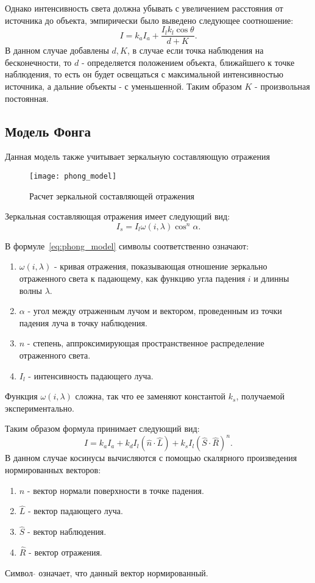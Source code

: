 Однако интенсивность света должна убывать с увеличением расстояния от источника до объекта, эмпирически было выведено следующее соотношение:
\begin{equation} 
	I = k_aI_a + \frac{I_lk_l\cos\theta}{d + K}.
	\label{eq:lambert_model_space}
\end{equation}
В данном случае добавлены $d,K$, в случае если точка наблюдения на бесконечности, то $d$ - определяется положением объекта,
ближайшего к точке наблюдения, то есть он будет освещаться с максимальной интенсивностью источника, а дальние объекты - с уменьшенной.
Таким образом $K$ - произвольная постоянная. \cite{Rodgers}


\subsection{Модель Фонга}
Данная модель также учитывает зеркальную составляющую отражения
\begin{figure}[h]
	\centering
	\texttt{[image: phong\_model]}
	\caption{Расчет зеркальной составляющей отражения}
	\label{fig:phong_model}
\end{figure}

Зеркальная составляющая отражения имеет следующий вид:
\begin{equation} 
	I_s = I_l\omega(i,\lambda)\cos^n \alpha.
	\label{eq:phong_model}
\end{equation}

В формуле~\ref{eq:phong_model} символы соответственно означают:
\begin{enumerate} 
	\item $\omega(i,\lambda)$ - кривая отражения, показывающая отношение зеркально отраженного света к падающему, как функцию угла падения $i$ и длинны волны $\lambda$.
	\item $\alpha$ - угол между отраженным лучом и вектором, проведенным из точки падения луча в точку наблюдения.
	\item $n$ - степень, аппроксимирующая пространственное распределение отраженного света.
	\item $I_l$ - интенсивность падающего луча.
\end{enumerate}
Функция $\omega(i,\lambda)$ сложна, так что ее заменяют константой $k_s$, получаемой экспериментально.


Таким образом формула принимает следующий вид:
\begin{equation} 
	I = k_aI_a + k_dI_{l}(\hat{n} \cdot \hat{L}) + k_s  I_{l}(\hat{S} \cdot \hat{R})^n.
\end{equation}
В данном случае косинусы вычисляются с помощью скалярного произведения нормированных векторов:
\begin{enumerate}
	\item $\hat{n}$ - вектор нормали поверхности в точке падения.
	\item $\hat{L}$ - вектор падающего луча.
	\item $\hat{S}$ - вектор наблюдения.
	\item $\hat{R}$ - вектор отражения.
\end{enumerate}
Символ $\hat{}$ означает, что данный вектор нормированный.\cite{Rodgers}





